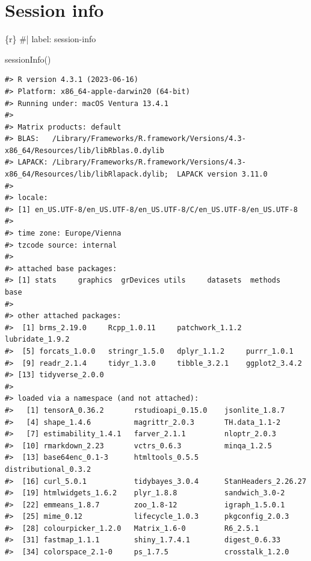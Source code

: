 \documentclass[
  letterpaper,
  DIV=11,
  numbers=noendperiod]{scrreprt}
\newenvironment{Shaded}{\begin{snugshade}}{\end{snugshade}}
\newcommand{\CommentTok}[1]{\textcolor[rgb]{0.37,0.37,0.37}{#1}}
\newcommand{\FunctionTok}[1]{\textcolor[rgb]{0.28,0.35,0.67}{#1}}
\newcommand{\InformationTok}[1]{\textcolor[rgb]{0.37,0.37,0.37}{#1}}
\newcommand{\NormalTok}[1]{\textcolor[rgb]{0.00,0.23,0.31}{#1}}
\begin{document}
\hypertarget{session-info}{%
\section{Session info}\label{session-info}}

\begin{Shaded}
\begin{Highlighting}[]
\InformationTok{\textasciigrave{}\textasciigrave{}\textasciigrave{}\{r\}}
\CommentTok{\#| label: session{-}info}

\FunctionTok{sessionInfo}\NormalTok{()}
\InformationTok{\textasciigrave{}\textasciigrave{}\textasciigrave{}}
\end{Highlighting}
\end{Shaded}

\begin{verbatim}
#> R version 4.3.1 (2023-06-16)
#> Platform: x86_64-apple-darwin20 (64-bit)
#> Running under: macOS Ventura 13.4.1
#> 
#> Matrix products: default
#> BLAS:   /Library/Frameworks/R.framework/Versions/4.3-x86_64/Resources/lib/libRblas.0.dylib 
#> LAPACK: /Library/Frameworks/R.framework/Versions/4.3-x86_64/Resources/lib/libRlapack.dylib;  LAPACK version 3.11.0
#> 
#> locale:
#> [1] en_US.UTF-8/en_US.UTF-8/en_US.UTF-8/C/en_US.UTF-8/en_US.UTF-8
#> 
#> time zone: Europe/Vienna
#> tzcode source: internal
#> 
#> attached base packages:
#> [1] stats     graphics  grDevices utils     datasets  methods   base     
#> 
#> other attached packages:
#>  [1] brms_2.19.0     Rcpp_1.0.11     patchwork_1.1.2 lubridate_1.9.2
#>  [5] forcats_1.0.0   stringr_1.5.0   dplyr_1.1.2     purrr_1.0.1    
#>  [9] readr_2.1.4     tidyr_1.3.0     tibble_3.2.1    ggplot2_3.4.2  
#> [13] tidyverse_2.0.0
#> 
#> loaded via a namespace (and not attached):
#>   [1] tensorA_0.36.2       rstudioapi_0.15.0    jsonlite_1.8.7      
#>   [4] shape_1.4.6          magrittr_2.0.3       TH.data_1.1-2       
#>   [7] estimability_1.4.1   farver_2.1.1         nloptr_2.0.3        
#>  [10] rmarkdown_2.23       vctrs_0.6.3          minqa_1.2.5         
#>  [13] base64enc_0.1-3      htmltools_0.5.5      distributional_0.3.2
#>  [16] curl_5.0.1           tidybayes_3.0.4      StanHeaders_2.26.27 
#>  [19] htmlwidgets_1.6.2    plyr_1.8.8           sandwich_3.0-2      
#>  [22] emmeans_1.8.7        zoo_1.8-12           igraph_1.5.0.1      
#>  [25] mime_0.12            lifecycle_1.0.3      pkgconfig_2.0.3     
#>  [28] colourpicker_1.2.0   Matrix_1.6-0         R6_2.5.1            
#>  [31] fastmap_1.1.1        shiny_1.7.4.1        digest_0.6.33       
#>  [34] colorspace_2.1-0     ps_1.7.5             crosstalk_1.2.0     

\end{verbatim}
\end{document}
